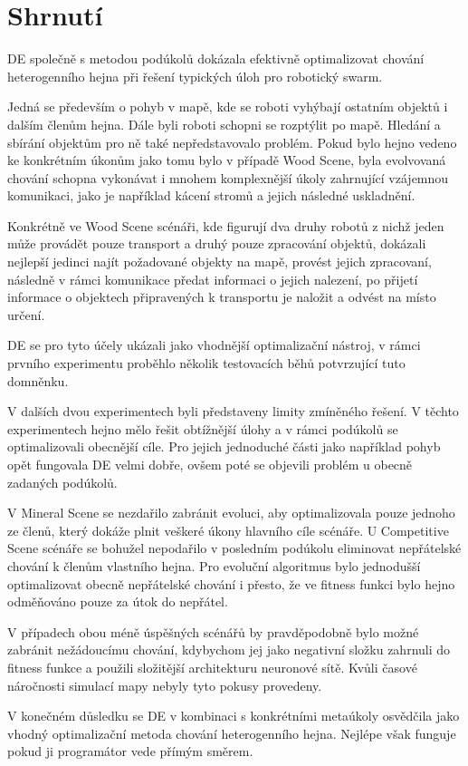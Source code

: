 \section{Shrnutí}
DE společně s metodou podúkolů dokázala efektivně optimalizovat chování heterogenního hejna při řešení typických úloh pro robotický swarm. 
\par 
Jedná se především o pohyb v mapě, kde se roboti vyhýbají ostatním objektů i dalším členům hejna. Dále byli roboti schopni se rozptýlit po mapě. Hledání a sbírání objektům pro ně také nepředstavovalo problém. Pokud bylo hejno vedeno ke konkrétním úkonům jako tomu bylo v případě Wood Scene, byla evolvovaná chování schopna vykonávat i mnohem komplexnější úkoly zahrnující vzájemnou komunikaci, jako je například kácení stromů a jejich následné uskladnění. \par 
Konkrétně ve Wood Scene scénáři, kde figurují dva druhy robotů z nichž jeden může provádět pouze transport a druhý pouze zpracování objektů, dokázali nejlepší jedinci najít požadované objekty na mapě, provést jejich zpracovaní, následně v rámci komunikace předat informaci o jejich nalezení, po přijetí informace o objektech připravených k transportu je naložit a odvést na místo určení.   
\par
DE se pro tyto účely ukázali jako vhodnější optimalizační nástroj, v rámci prvního experimentu proběhlo několik testovacích běhů potvrzující tuto domněnku.
\par
V dalších dvou experimentech byli představeny limity zmíněného řešení. V těchto experimentech hejno mělo řešit obtížnější úlohy a v rámci podúkolů se optimalizovali obecnější cíle. Pro jejich jednoduché části jako například pohyb opět fungovala DE velmi dobře, ovšem poté se objevili problém u obecně zadaných podúkolů. 
\par 
V Mineral Scene se nezdařilo zabránit evoluci, aby optimalizovala pouze jednoho ze členů, který dokáže plnit veškeré úkony hlavního cíle scénáře. U Competitive Scene scénáře se bohužel nepodařilo v posledním podúkolu eliminovat nepřátelské chování k členům vlastního hejna. Pro evoluční algoritmus bylo jednodušší optimalizovat obecně nepřátelské chování i přesto, že ve fitness funkci bylo hejno odměňováno pouze za útok do nepřátel. 
\par 
V případech obou méně úspěšných scénářů by pravděpodobně bylo možné zabránit nežádoucímu chování, kdybychom jej jako negativní složku zahrnuli do fitness funkce a použili složitější architekturu neuronové sítě. Kvůli časové náročnosti simulací mapy nebyly tyto pokusy provedeny. 
\par
V konečném důsledku se DE v kombinaci s konkrétními metaúkoly osvědčila jako vhodný optimalizační metoda chování heterogenního hejna. Nejlépe však funguje pokud ji programátor vede přímým směrem. 